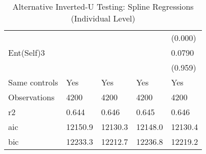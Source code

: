\begin{table}[]
\begin{tabular}{@{}lllll@{}}
              &               &               &                & (0.000)        \\
Ent(Self)3    &               &               &                & 0.0790         \\
              &               &               &                & (0.959)        \\
Same controls & Yes           & Yes           & Yes            & Yes            \\
Observations  & 4200          & 4200          & 4200           & 4200           \\
r2            & 0.644         & 0.646         & 0.645          & 0.646          \\
aic           & 12150.9       & 12130.3       & 12148.0        & 12130.4        \\
bic           & 12233.3       & 12212.7       & 12236.8        & 12219.2        \\ \bottomrule
\end{tabular}
\caption{Alternative Inverted-U Testing: Spline Regressions (Individual Level)}
\end{table}
